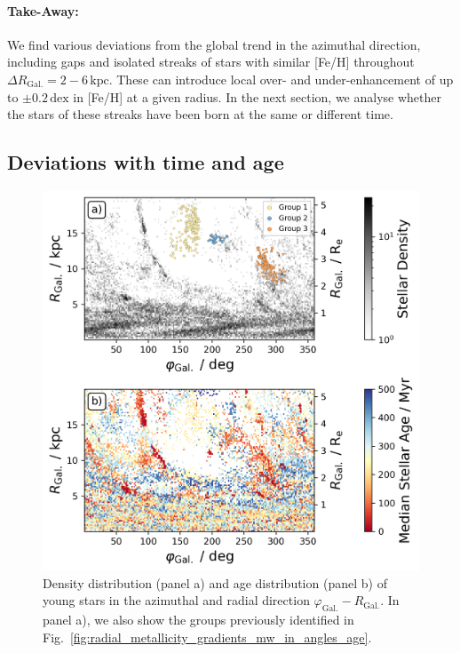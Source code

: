 \documentclass[twocolumn,apj,numberedappendix,appendixfloats]{openjournal}
\begin{document}
\begin{CJK*}{UTF8}{gbsn}
\paragraph*{Take-Away:} We find various deviations from the global trend in the azimuthal direction, including gaps and isolated streaks of stars with similar [Fe/H] throughout $\Delta R_\mathrm{Gal.} = 2-6\,\mathrm{kpc}$. These can introduce local over- and under-enhancement of up to $\pm 0.2\,\mathrm{dex}$ in [Fe/H] at a given radius. In the next section, we analyse whether the stars of these streaks have been born at the same or different time.

\subsection{Deviations with time and age}
\label{sec:coherence_age_radial_metallicity_gradients}

\begin{figure}
    \centering
    \includegraphics[width=\columnwidth]{figures/phi_angle_R_follow_up.png}
    \caption{Density distribution (panel a) and age distribution (panel b) of young stars in the azimuthal and radial direction $\varphi_\mathrm{Gal.}-R_\mathrm{Gal.}$. In panel a), we also show the groups previously identified in Fig.~\ref{fig:radial_metallicity_gradients_mw_in_angles_age}.}
    \label{fig:phi_angle_R_follow_up}
\end{figure}


\end{CJK*}
\end{document}
